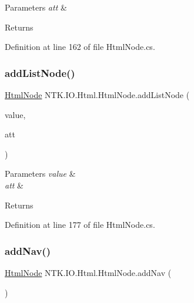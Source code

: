 \begin{DoxyParams}{Parameters}
{\em att} & \\
\hline
\end{DoxyParams}
\begin{DoxyReturn}{Returns}

\end{DoxyReturn}


Definition at line 162 of file Html\+Node.\+cs.

\mbox{\label{class_n_t_k_1_1_i_o_1_1_html_1_1_html_node_ad101aaa81a43b5a0f4b2f4575f921822}} 
\subsubsection{\texorpdfstring{addListNode()}{addListNode()}}
{\footnotesize\ttfamily \mbox{\hyperlink{class_n_t_k_1_1_i_o_1_1_html_1_1_html_node}{Html\+Node}} N\+T\+K.\+I\+O.\+Html.\+Html\+Node.\+add\+List\+Node (\begin{DoxyParamCaption}\item[{String}]{value,  }\item[{params \mbox{\hyperlink{class_n_t_k_1_1_i_o_1_1_xml_1_1_xml_attribute}{Xml\+Attribute}} \mbox{[}$\,$\mbox{]}}]{att }\end{DoxyParamCaption})}






\begin{DoxyParams}{Parameters}
{\em value} & \\
\hline
{\em att} & \\
\hline
\end{DoxyParams}
\begin{DoxyReturn}{Returns}

\end{DoxyReturn}


Definition at line 177 of file Html\+Node.\+cs.

\mbox{\label{class_n_t_k_1_1_i_o_1_1_html_1_1_html_node_ab64214421a7afcdd6ea7a5a31ad4ed05}} 
\subsubsection{\texorpdfstring{addNav()}{addNav()}}
{\footnotesize\ttfamily \mbox{\hyperlink{class_n_t_k_1_1_i_o_1_1_html_1_1_html_node}{Html\+Node}} N\+T\+K.\+I\+O.\+Html.\+Html\+Node.\+add\+Nav (\begin{DoxyParamCaption}{ }\end{DoxyParamCaption})}



